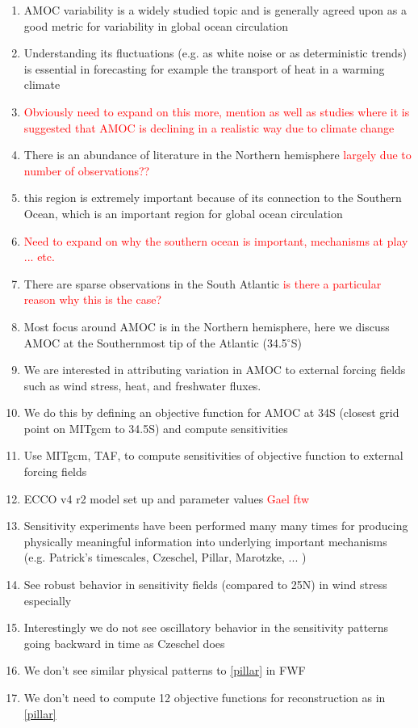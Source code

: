\documentclass[a4paper,11pt]{article}
\newcommand{\red}[1]{\textcolor{red}{#1}}
\begin{document}
	\begin{enumerate} 

	  \item AMOC variability is a widely studied topic and is generally agreed upon as a good metric for variability in global ocean circulation 
	  \item Understanding its fluctuations (e.g. as white noise or as deterministic trends) is essential in forecasting for example the transport of heat in a warming climate
	  \item \red{Obviously need to expand on this more, mention \cite{wunschAndHeimbach_AMOC} as well as studies where it is suggested that AMOC is declining in a realistic way due to climate change} 
	  \item There is an abundance of literature in the Northern hemisphere \red{largely due to number of observations??} 
	  \item this region is extremely important because of its connection to the Southern Ocean, which is an important region for global ocean circulation 
	  \item \red{Need to expand on why the southern ocean is important, mechanisms at play ... etc.}
	  \item There are sparse observations in the South Atlantic \red{is there a particular reason why this is the case?}
	  \item Most focus around AMOC is in the Northern hemisphere, here we discuss AMOC at the Southernmost tip of the Atlantic (34.5$^{\circ}$S)
	  \item We are interested in attributing variation in AMOC to external forcing fields such as wind stress, heat, and freshwater fluxes.
	  \item We do this by defining an objective function for AMOC at 34S (closest grid point on MITgcm to 34.5S) and compute sensitivities 
	  \item Use MITgcm, TAF, to compute sensitivities of objective function to external forcing fields
	  \item ECCO v4 r2 model set up and parameter values \red{Gael ftw}
	  \item Sensitivity experiments have been performed many many times for producing physically meaningful information into underlying important mechanisms (e.g. Patrick's timescales, Czeschel, Pillar, Marotzke, ... )
	  \item See robust behavior in sensitivity fields (compared to 25N) in wind stress especially 
	  \item Interestingly we do not see oscillatory behavior in the sensitivity patterns going backward in time as Czeschel does
	  \item We don't see similar physical patterns to \ref{pillar} in FWF
	  \item We don't need to compute 12 objective functions for reconstruction as in \ref{pillar}
 
	\end{enumerate} 
\end{document}
